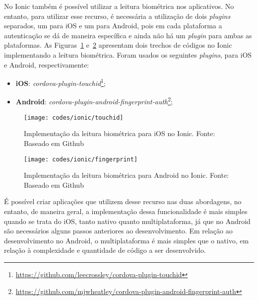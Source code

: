 No Ionic também é possível utilizar a leitura biométrica nos aplicativos. No entanto, para utilizar esse recurso, é necessária a utilização de dois \textit{plugins} separados, um para iOS e um para Android, pois em 
cada plataforma a autenticação se dá de maneira específica e ainda não há um \textit{plugin} para ambas as plataformas. As Figuras~\ref{fig:finger-ios-ionic} e~\ref{fig:finger-android-ionic} apresentam dois trechos de 
códigos no Ionic implementando a leitura biométrica. Foram usados os seguintes \textit{plugins}, para iOS e Android, respectivamente:
\begin{itemize}
	\item \textbf{iOS}: \textit{cordova-plugin-touchid}\footnote{\url{https://github.com/leecrossley/cordova-plugin-touchid}};
	\item \textbf{Android}: \textit{cordova-plugin-android-fingerprint-auth}\footnote{\url{https://github.com/mjwheatley/cordova-plugin-android-fingerprint-auth}}; 
\end{itemize}
\begin{figure}[H]
	\centering
	\texttt{[image: codes/ionic/touchid]}
	\caption[Implementação da leitura biométrica para iOS no Ionic]{Implementação da leitura biométrica para iOS no Ionic. Fonte: Baseado em Github\protect\footnotemark}
	\label{fig:finger-ios-ionic}
\end{figure}
\begin{figure}[H]
	\centering
	\texttt{[image: codes/ionic/fingerprint]}
	\caption[Implementação da leitura biométrica para Android no Ionic]{Implementação da leitura biométrica para Android no Ionic. Fonte: Baseado em Github\protect\footnotemark}
	\label{fig:finger-android-ionic}
\end{figure}

É possível criar aplicações que utilizem desse recurso nas duas abordagens, no entanto, de maneira geral, a implementação dessa funcionalidade é mais simples quando se trata do iOS, tanto nativo quanto multiplataforma, já 
que no Android são necessários alguns passos anteriores ao desenvolvimento. Em relação ao desenvolvimento no Android, o multiplataforma é mais simples que o nativo, em relação à complexidade e quantidade de código a ser 
desenvolvido.

